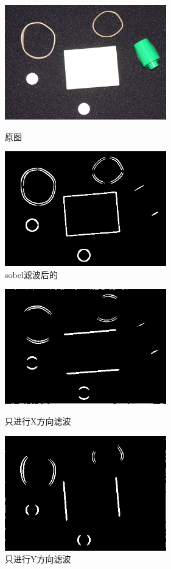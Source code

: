 \documentclass[11pt, a4paper, UTF8]{ctexart}
\begin{document}
\begin{figure}[H]
  \centering
  \begin{minipage}[t]{0.48\textwidth}
  \centering
  \includegraphics[width=7cm]{rubberband_cap.png}
  \caption{原图}
  \end{minipage}
  \begin{minipage}[t]{0.48\textwidth}
  \centering
  \includegraphics[width=7cm]{sobel_all_rubberband_cap.png}
  \caption{sobel滤波后的}
  \end{minipage}
\end{figure}



\begin{figure}[H]
  \centering
  \begin{minipage}[t]{0.48\textwidth}
  \centering
  \includegraphics[width=7cm]{sobel_X_rubberband_cap.png}
  \caption{只进行X方向滤波}
  \end{minipage}
  \begin{minipage}[t]{0.48\textwidth}
  \centering
  \includegraphics[width=7cm]{sobel_Y_rubberband_cap.png}
  \caption{只进行Y方向滤波}
  \end{minipage}
\end{figure}
\end{document}
